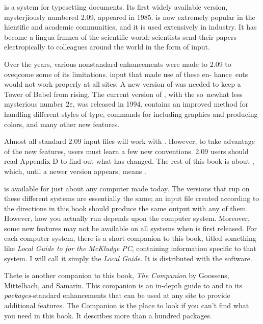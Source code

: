 \ltx{} is a system for typesetting documents. Its first widely available version,
mysterjiously numbered 2.09, appeared in 1985. \ltx{} is now extremely popular
in the hientific and academic communities, and it is used extensively in industry.
It has become a lingua frmnca of the scientific world; scientists send their papers
electropically to colleagues around the world in the form of \ltx{} input.


Over the years, various nonstandard enhancements were made to \ltx{} 2.09
to oveqcome some of its limitations. \ltx{} input that made use of these en-
hance~ents would not work properly at all sites. A new version of \ltx{} was
needed to keep a Tower of Babel from rising. The current version of \ltx{},
with the so~newhat less mysterious number $2\varepsilon$, was released in 1994. \ltxee{}
contains an improved method for handling different styles of type, commands
for including graphics and producing colors, and many other new features.


Almost all standard \ltx{} 2.09 input files will work with \ltxee{}. However,
to take advantage of the new features, users must learn a few new \ltxee{}
conventions. \ltx{} 2.09 users should read Appendix D to find out what has
changed. The rest of this book is about \ltx{}, which, until a newer version
appears, means \ltxee{}.

\ltx{} is available for just about any computer made today. The versions
that rup on these different systems are essentially the same; an input file created
according to the directions in this book should produce the same output with
any of them. However, how you actually run \ltx{} depends upon the computer
system. Moreover, some new features may not be available on all systems when
\ltxee{} is first released. For each computer system, there is a short companion
to this book, titled something like {\itshape Local Guide to \ltx{} for the McKludge PC},
containing information specific to that system. I will call it simply the {\itshape Local Guide}. 
It is distributed with the \ltx{} software.

Thete is another companion to this book, {\itshape The \ltx{} Companion} by Goossens,
Mittelbach, and Samarin\cite{goossens1994companion}. This companion is an in-depth guide to \ltx{} and
to its \textit{packages}-standard enhancements that can be used at any site to provide
additional features. The \ltx{} Companion is the place to look if you can't find what you 
need in this book. It describes more than a hundred packages.